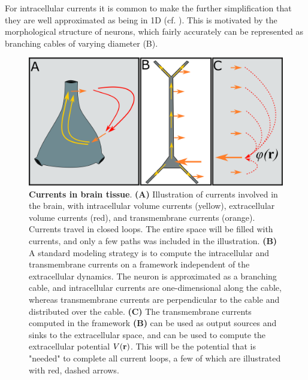For intracellular currents it is common to make the further simplification that they are well approximated as being in 1D (cf. ). 
This is motivated by the morphological structure of neurons, which fairly accurately can be represented as branching cables of varying diameter (B).

\begin{figure}[!ht]
\begin{center}
\includegraphics[width=1.0\textwidth]{Figures/Basics/Twostep.png}
\end{center}
\caption{{\bf Currents in brain tissue}. {\bf(A)} Illustration of currents involved in the brain, with intracellular volume currents (yellow), extracellular volume currents (red), and transmembrane currents (orange). Currents travel in closed loops. The entire space will be filled with currents, and only a few paths was included in the illustration. {\bf(B)} A standard modeling strategy is to compute the intracellular and transmembrane currents on a framework independent of the extracellular dynamics. The neuron is approximated as a branching cable, and intracellular currents are one-dimensional along the cable, whereas transmembrane currents are perpendicular to the cable and distributed over the cable. {\bf(C)} The transmembrane currents computed in the framework {\bf(B)} can be used as output sources and sinks to the extracellular space, and can be used to compute the extracellular potential $V({\bf r})$. This will be the potential that is "needed" to complete all current loops, a few of which are illustrated with red, dashed arrows.
 
}
\label{fig:Basics:Twostep}
\end{figure}


